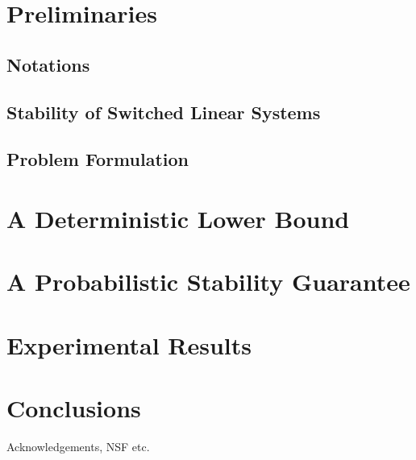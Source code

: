 \documentclass[twocolumn]{autart}
\begin{document}
\section{Preliminaries}\label{sec:preliminaries}
\subsection{Notations}
 
\subsection{Stability of Switched Linear Systems}\label{sec:stab}

\subsection{Problem Formulation}


\section{A Deterministic Lower Bound}\label{sec:lowerBound}


\section{A Probabilistic Stability Guarantee}\label{sec:upperbound}



\section{Experimental Results}\label{sec:experiments}


\section{Conclusions}\label{sec:conclusions}



\begin{ack}                               %
Acknowledgements, NSF etc.  %
\end{ack}

 


%
\end{document}
